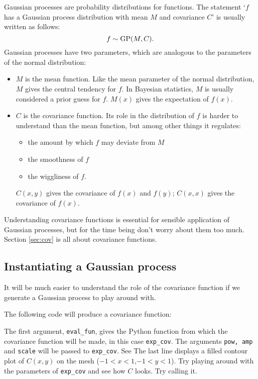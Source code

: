 \documentclass{manual}
\begin{document}
Gaussian processes are probability distributions for functions. The statement `$f$ has a Gaussian process distribution with mean $M$ and covariance $C$' is usually written as follows:
\begin{equation}
    f\sim\textup{GP}(M,C).
\end{equation}
Gaussian processes have two parameters, which are analogous to the parameters of the normal distribution:
\begin{itemize}
    \item $M$ is the mean function. Like the mean parameter of the normal distribution, $M$ gives the central tendency for $f$. In Bayesian statistics, $M$ is usually considered a prior guess for $f$. $M(x)$ gives the expectation of $f(x)$.
    \item $C$  is the covariance function. Its role in the distribution of $f$ is harder to understand than the mean function, but among other things it regulates:
    \begin{itemize}
        \item the amount by which $f$ may deviate from $M$
        \item the smoothness of $f$
        \item the wiggliness of $f$.
    \end{itemize}
    $C(x,y)$ gives the covariance of $f(x)$ and $f(y)$; $C(x,x)$ gives the covariance of $f(x)$.
\end{itemize}
Understanding covariance functions is essential for sensible application of Gaussian processes, but for the time being don't worry about them too much. Section \ref{sec:cov} is all about covariance functions.


\subsection{Instantiating a Gaussian process} 

It will be much easier to understand the role of the covariance function if we generate a Gaussian process to play around with. 

The following code will produce a covariance function:


\bigskip
The first argument, \texttt{eval\_fun}, gives the Python function from which the covariance function will be made, in this case \texttt{exp\_cov}. The arguments \texttt{pow, amp} and \texttt{scale} will be passed to \texttt{exp\_cov}. See The last line displays a filled contour plot of $C(x,y)$ on the mesh ($-1<x<1$,$-1<y<1$). Try playing around with the parameters of \texttt{exp\_cov} and see how $C$ looks. Try calling it.
\end{document}
